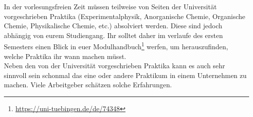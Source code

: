 In der vorlesungsfreien Zeit müssen teilweise von Seiten der Universität vorgeschrieben Praktika (Experimentalphysik, Anorganische Chemie, Organische Chemie, Physikalische Chemie, etc.) absolviert werden. Diese sind jedoch abhängig von eurem Studiengang. Ihr solltet daher im verlaufe des ersten Semesters einen Blick in euer Modulhandbuch\footnote{\url{https://uni-tuebingen.de/de/74348}} werfen, um herauszufinden, welche Praktika ihr wann machen müsst.\\	%

Neben den von der Universität vorgeschrieben Praktika kann es auch sehr sinnvoll sein schonmal das eine oder andere Praktikum in einem Unternehmen zu machen. Viele Arbeitgeber schätzen solche Erfahrungen.

\vfill